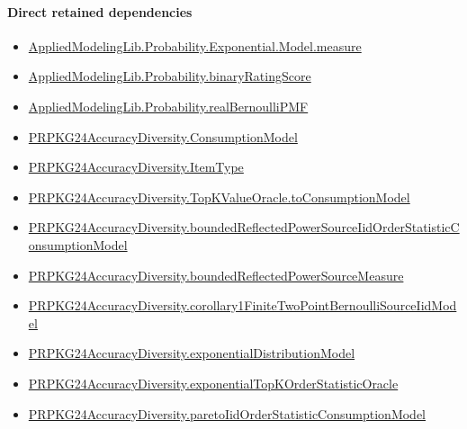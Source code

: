 \documentclass[10pt]{article}
\begin{document}
\paragraph{Direct retained dependencies}
\begin{itemize}\raggedright
\item \hyperlink{governing-declaration-204558c62e63ea8d}{Applied\allowbreak{}Modeling\allowbreak{}Lib.\allowbreak{}Probability.\allowbreak{}Exponential.\allowbreak{}Model.\allowbreak{}measure}
\item \hyperlink{governing-declaration-c71eaa38276816e2}{Applied\allowbreak{}Modeling\allowbreak{}Lib.\allowbreak{}Probability.\allowbreak{}binary\allowbreak{}Rating\allowbreak{}Score}
\item \hyperlink{governing-declaration-0af9560a94422208}{Applied\allowbreak{}Modeling\allowbreak{}Lib.\allowbreak{}Probability.\allowbreak{}real\allowbreak{}Bernoulli\allowbreak{}PMF}
\item \hyperlink{governing-declaration-ee3d86b30aa41ed7}{PRPKG24\allowbreak{}Accuracy\allowbreak{}Diversity.\allowbreak{}Consumption\allowbreak{}Model}
\item \hyperlink{governing-declaration-562ef32e180a12be}{PRPKG24\allowbreak{}Accuracy\allowbreak{}Diversity.\allowbreak{}Item\allowbreak{}Type}
\item \hyperlink{governing-declaration-588a2f7919921f81}{PRPKG24\allowbreak{}Accuracy\allowbreak{}Diversity.\allowbreak{}Top\allowbreak{}K\allowbreak{}Value\allowbreak{}Oracle.\allowbreak{}to\allowbreak{}Consumption\allowbreak{}Model}
\item \hyperlink{governing-declaration-feab7cfa13bfcde0}{PRPKG24\allowbreak{}Accuracy\allowbreak{}Diversity.\allowbreak{}bounded\allowbreak{}Reflected\allowbreak{}Power\allowbreak{}Source\allowbreak{}Iid\allowbreak{}Order\allowbreak{}Statistic\allowbreak{}Consumption\allowbreak{}Model}
\item \hyperlink{governing-declaration-bc27f6b70e492863}{PRPKG24\allowbreak{}Accuracy\allowbreak{}Diversity.\allowbreak{}bounded\allowbreak{}Reflected\allowbreak{}Power\allowbreak{}Source\allowbreak{}Measure}
\item \hyperlink{governing-declaration-1d49eb232cf9f684}{PRPKG24\allowbreak{}Accuracy\allowbreak{}Diversity.\allowbreak{}corollary1\allowbreak{}Finite\allowbreak{}Two\allowbreak{}Point\allowbreak{}Bernoulli\allowbreak{}Source\allowbreak{}Iid\allowbreak{}Model}
\item \hyperlink{governing-declaration-50b1da7b92c4bb45}{PRPKG24\allowbreak{}Accuracy\allowbreak{}Diversity.\allowbreak{}exponential\allowbreak{}Distribution\allowbreak{}Model}
\item \hyperlink{governing-declaration-d8497abe2c9d995d}{PRPKG24\allowbreak{}Accuracy\allowbreak{}Diversity.\allowbreak{}exponential\allowbreak{}Top\allowbreak{}K\allowbreak{}Order\allowbreak{}Statistic\allowbreak{}Oracle}
\item \hyperlink{governing-declaration-9af16f6791d21c9c}{PRPKG24\allowbreak{}Accuracy\allowbreak{}Diversity.\allowbreak{}pareto\allowbreak{}Iid\allowbreak{}Order\allowbreak{}Statistic\allowbreak{}Consumption\allowbreak{}Model}
\end{itemize}
\hypertarget{governing-declaration-f665140f30fcdeaf}{}
\end{document}
